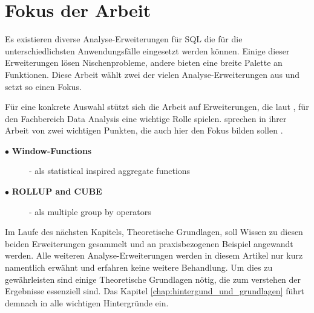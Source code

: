 \section{Fokus der Arbeit}
\label{sec:fokus_der_arbeit} Es existieren diverse Analyse-Erweiterungen für SQL
die für die unterschiedlichsten Anwendungsfälle eingesetzt werden können. Einige
dieser Erweiterungen lösen Nischenprobleme, andere bieten eine breite Palette an
Funktionen. Diese Arbeit wählt zwei der vielen Analyse-Erweiterungen aus und setzt
so einen Fokus.

Für eine konkrete Auswahl stützt sich die Arbeit auf Erweiterungen, die laut
\citet{FOTACHE2015243}, für den Fachbereich Data Analysis eine wichtige Rolle
spielen. \citet{FOTACHE2015243} sprechen in ihrer Arbeit von zwei wichtigen
Punkten, die auch hier den Fokus bilden sollen \citep[vgl.][S. 245]{FOTACHE2015243}.

\begin{description}
	\item[$\bullet$ \textbf{Window-Functions}] - als statistical inspired aggregate
		functions \\ \citep[vgl.][S. 247 - 248]{FOTACHE2015243}

	\item[$\bullet$ \textbf{ROLLUP and CUBE}] - als multiple group by operators \\
		\citep[vgl.][S. 247 - 248]{FOTACHE2015243}
\end{description}

Im Laufe des nächsten Kapitels, Theoretische Grundlagen, soll Wissen zu diesen beiden
Erweiterungen gesammelt und an praxisbezogenen Beispiel angewandt werden. Alle
weiteren Analyse-Erweiterungen werden in diesem Artikel nur kurz namentlich
erwähnt und erfahren keine weitere Behandlung. Um dies zu gewährleisten sind einige
Theoretische Grundlagen nötig, die zum verstehen der Ergebnisse essenziell sind.
Das Kapitel \ref{chap:hintergund_und_grundlagen} führt demnach in alle wichtigen
Hintergründe ein.